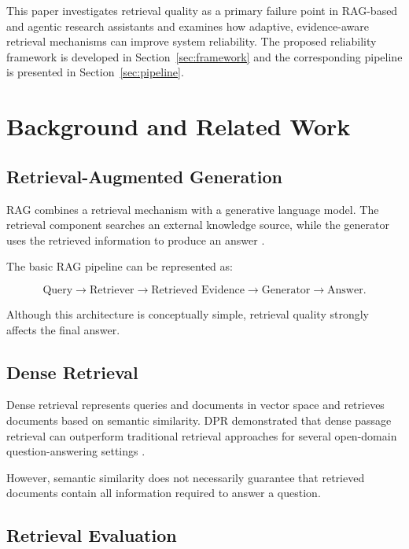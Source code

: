 \documentclass[12pt,a4paper]{article}
\begin{document}
This paper investigates retrieval quality as a primary failure point in
RAG-based and agentic research assistants and examines how adaptive,
evidence-aware retrieval mechanisms can improve system reliability. The
proposed reliability framework is developed in
Section~\ref{sec:framework} and the corresponding pipeline is presented in
Section~\ref{sec:pipeline}.

\section{Background and Related Work}
\label{sec:background}

\subsection{Retrieval-Augmented Generation}

RAG combines a retrieval mechanism with a generative language model.
The retrieval component searches an external knowledge source, while the
generator uses the retrieved information to produce an answer
\cite{lewis2020rag}.

The basic RAG pipeline can be represented as:

\[
\text{Query}
\rightarrow
\text{Retriever}
\rightarrow
\text{Retrieved Evidence}
\rightarrow
\text{Generator}
\rightarrow
\text{Answer}.
\]

Although this architecture is conceptually simple, retrieval quality
strongly affects the final answer.

\subsection{Dense Retrieval}

Dense retrieval represents queries and documents in vector space and
retrieves documents based on semantic similarity. DPR demonstrated that
dense passage retrieval can outperform traditional retrieval approaches
for several open-domain question-answering settings
\cite{karpukhin2020dpr}.

However, semantic similarity does not necessarily guarantee that retrieved
documents contain all information required to answer a question.

\subsection{Retrieval Evaluation}
\end{document}
